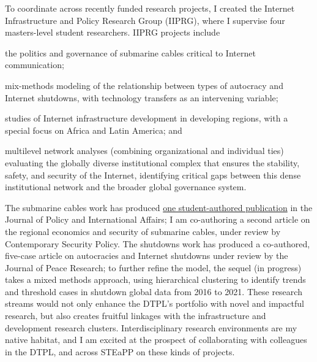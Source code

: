 \documentclass[11pt]{letter}
\begin{document}
\begin{letter}
To coordinate across recently funded research projects, I created the Internet Infrastructure and Policy Research Group (IIPRG), where I supervise four masters-level student researchers.
%
IIPRG projects include %
%
\begin{inparaenum}
  \item the politics and governance of submarine cables critical to Internet communication; 
  \item mix-methods modeling of the relationship between types of autocracy and Internet shutdowns, with technology transfers as an intervening variable; 
  \item studies of Internet infrastructure development in developing regions, with a special focus on Africa and Latin America; and 
  \item multilevel network analyses (combining organizational and individual ties) evaluating the globally diverse institutional complex that ensures the stability, safety, and security of the Internet, identifying critical gaps between this dense institutional network and the broader global governance system.
\end{inparaenum}  
%
The submarine cables work has produced \href{https://jpia.princeton.edu/news/leveraging-submarine-cables-political-gain-us-responses-chinese-strategy}{one student-authored publication} in the Journal of Policy and International Affairs; I am co-authoring a second article on the regional economics and security of submarine cables, under review by Contemporary Security Policy.
%
The shutdowns work has produced a co-authored, five-case article on autocracies and Internet shutdowns under review by the Journal of Peace Research; to further refine the model, the sequel (in progress) takes a mixed methods approach, using hierarchical clustering to identify trends and threshold cases in shutdown global data from 2016 to 2021. 
%
These research streams would not only enhance the DTPL's portfolio with novel and impactful research, but also creates fruitful linkages with the infrastructure and development research clusters.
%
Interdisciplinary research environments are my native habitat, and I am excited at the prospect of collaborating with colleagues in the DTPL, and across STEaPP on these kinds of projects.
% 
%




\end{letter}
\end{document}

